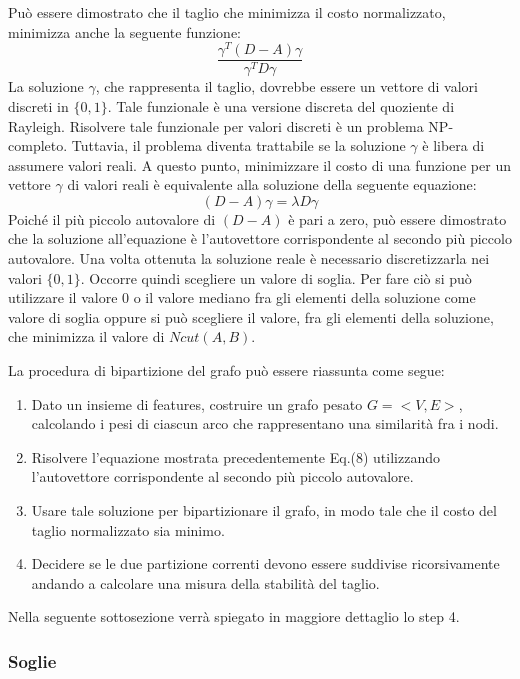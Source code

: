 Può essere dimostrato che il taglio che minimizza il costo normalizzato, minimizza anche la seguente funzione: \begin{equation}
\frac{\gamma^{T}(D-A)\gamma}{\gamma^{T}D\gamma}
\end{equation}
La soluzione $\gamma$, che rappresenta il taglio, dovrebbe essere un vettore di valori discreti in $\lbrace 0,1 \rbrace$. Tale funzionale è una versione discreta del quoziente di Rayleigh. Risolvere tale funzionale per valori discreti è un problema NP-completo. Tuttavia, il problema diventa trattabile se la soluzione $\gamma$ è libera di assumere valori reali. A questo punto, minimizzare il costo di una funzione per un vettore $\gamma$ di valori reali è equivalente alla soluzione della seguente equazione: 
\begin{equation}
(D-A) \gamma = \lambda D \gamma
\end{equation}
Poiché il più piccolo autovalore di $(D-A)$ è pari a zero, può essere dimostrato che la soluzione all'equazione è l'autovettore corrispondente al secondo più piccolo autovalore.
Una volta ottenuta la soluzione reale è necessario discretizzarla nei valori $\lbrace 0,1 \rbrace$. Occorre quindi scegliere un valore di soglia. Per fare ciò si può utilizzare il valore 0 o il valore mediano fra gli elementi della soluzione come valore di soglia oppure si può scegliere il valore, fra gli elementi della soluzione, che minimizza il valore di $Ncut(A,B)$.

La procedura di bipartizione del grafo può essere riassunta come segue:
\begin{enumerate}
\item Dato un insieme di features, costruire un grafo pesato $G = <V,E>$, calcolando i pesi di ciascun arco che rappresentano una similarità fra i nodi.
\item Risolvere l'equazione mostrata precedentemente Eq.(8) utilizzando l'autovettore corrispondente al secondo più piccolo autovalore.
\item Usare tale soluzione per bipartizionare il grafo, in modo tale che il costo del taglio normalizzato sia minimo.
\item Decidere se le due partizione correnti devono essere suddivise ricorsivamente andando a calcolare una misura della stabilità del taglio.
\end{enumerate}

Nella seguente sottosezione verrà spiegato in maggiore dettaglio lo step 4.

\subsubsection{Soglie}

